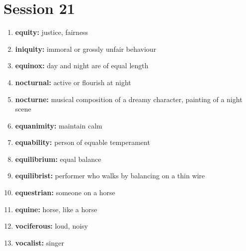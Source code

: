 \documentclass{article}
\begin{document}
\section{Session 21}
\begin{enumerate}
    \item \textbf{equity: }{justice, fairness}
    \item \textbf{iniquity: }{immoral or grossly unfair behaviour}
    \item \textbf{equinox: }{day and night are of equal length}
    \item \textbf{nocturnal: }{active or flourish at night}
    \item \textbf{nocturne: }{musical composition of a dreamy character, painting of a night scene}
    \item \textbf{equanimity: }{maintain calm}
    \item \textbf{equability: }{person of equable temperament}
    \item \textbf{equilibrium: }{equal balance}
    \item \textbf{equilibrist: }{performer who walks by balancing on a thin wire}
    \item \textbf{equestrian: }{someone on a horse}
    \item \textbf{equine: }{horse, like a horse}
    \item \textbf{vociferous: }{loud, noisy}
    \item \textbf{vocalist: }{singer}
    
\end{enumerate}
\end{document}
